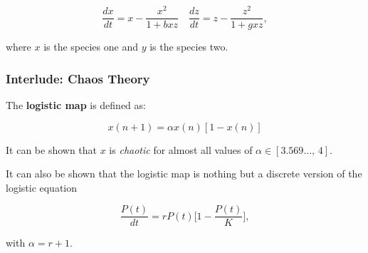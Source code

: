 \documentclass[a4paper]{extarticle}
\begin{document}
\[
    \frac{dx}{dt} = x - \frac{x^2}{1 + bxz} \quad \frac{dz}{dt} = z - \frac{z^2}{1 + gxz},
\]

where $x$ is the species one and $y$ is the species two.

\subsubsection{Interlude: Chaos Theory}

The \textbf{logistic map} is defined as:

\[
    x(n + 1) = \alpha x(n) [1 - x(n)]
\]

It can be shown that $x$ is \textit{chaotic} for almost all values of $\alpha \in [3.569..., \, 4]$.

It can also be shown that the logistic map is nothing but a discrete version of the logistic equation

\[
    \frac{P(t)}{dt} = rP(t) \big[1 - \frac{P(t)}{K} \big],
\]

with $\alpha = r + 1$.
\end{document}

